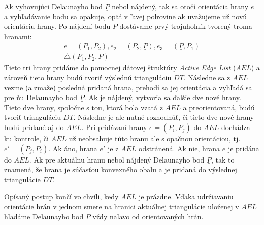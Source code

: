 \documentclass[11pt]{article}
\begin{document}
Ak vyhovujúci Delaunayho bod $\underline{P}$ nebol nájdený, tak sa otočí orientácia hrany $e$ a vyhľadávanie bodu sa opakuje, opäť v ľavej polrovine ak uvažujeme už novú orientáciu hrany. Po nájdení \linebreak bodu $\underline{P}$ dostávame prvý trojuholník tvorený troma hranami:
\begin{equation*}
\begin{gathered}
\nonumber e = (P_1, P_2), e_2 = (P_2, \underline{P}), e_3 = (\underline{P}, P_1)\\
\nonumber \triangle (P_1, P_2, \underline{P})
\end{gathered}
\end{equation*}
Tieto tri hrany pridáme do pomocnej dátovej štruktúry \textit{Active Edge List} ($AEL$) a zároveň tieto hrany budú tvoriť výslednú trianguláciu $DT$. Následne sa z $AEL$ vezme (a zmaže) posledná pridaná hrana, prehodí sa jej orientácia a vyhľadá sa pre ňu Delaunayho bod $\underline{P}$. Ak je nájdený, vytvoria sa ďalšie dve nové hrany. Tieto dve hrany, spoločne s tou, ktorá bola vzatá z $AEL$ a preorientovaná, budú tvoriť trianguláciu $DT$. \newline
Následne je ale nutné rozhodnúť, či tieto dve nové hrany budú pridané aj do $AEL$. Pri pridávaní hrany $e = (P_i,P_j)$ do $AEL$ dochádza ku kontrole, či $AEL$ už neobsahuje túto hranu ale s opačnou orientáciou, tj. $e' = (P_j, P_i)$. Ak áno, hrana $e'$ je z $AEL$ odstránená. Ak nie, hrana $e$ je pridána do $AEL$. \newline
Ak pre aktuálnu hranu nebol nájdený Delaunayho bod $\underline{P}$, tak to znamená, že hrana je súčasťou konvexného obalu a je pridaná do výslednej triangulácie $DT$. 

Opísaný postup končí vo chvíli, kedy $AEL$ je prázdne. Vďaka udržiavaniu orientácie hrán v
jednom smere na hranici aktuálnej triangulácie uloženej v $AEL$ hľadáme Delaunayho bod $\underline{P}$ vždy naľavo od orientovaných hrán.
\newpage
\end{document}
